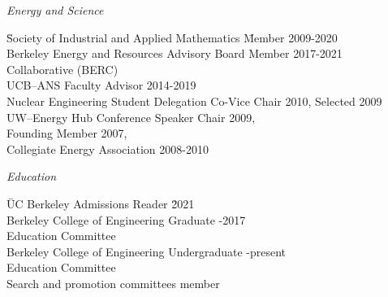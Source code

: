 \textit{Energy and Science}
\begin{tabbing}
\hspace*{4 em}\= Society of Industrial and Applied  Mathematics  \hspace*{1em} \= Member 2009-2020\\
%
\> Berkeley Energy and Resources \> Advisory Board Member 2017-2021 \\
\> \hspace*{4 em} Collaborative (BERC) \\
%
\> UCB--ANS \> Faculty Advisor 2014-2019  \\
%
%
%
\> Nuclear Engineering Student Delegation \> Co-Vice Chair 2010, Selected 2009\\
%
\> UW--Energy Hub \> Conference Speaker Chair 2009, \\
\> \> Founding Member 2007,  \\ \> \> Collegiate Energy Association 2008-2010
%
%
%
\end{tabbing}


\textit{Education}
\begin{tabbing}
\hspace*{2 em}\= UC Berkeley Admissions Reader \hspace*{10em} \= 2021\\ 
%
\> Berkeley College of Engineering Graduate -2017\\ 
\> \hspace*{2 em}Education Committee\\
%
\> Berkeley College of Engineering Undergraduate -present\\ 
\> \hspace*{2 em}Education Committee\\
%
\> Search and promotion committees \> member
\end{tabbing}

